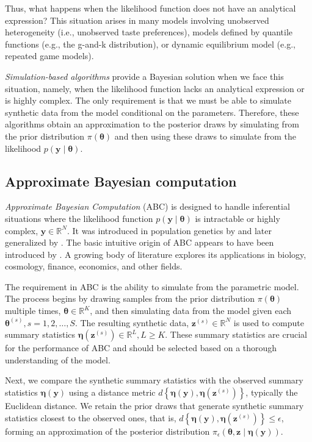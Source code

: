 Thus, what happens when the likelihood function does not have an analytical expression? This situation arises in many models involving unobserved heterogeneity (i.e., unobserved taste preferences), models defined by quantile functions (e.g., the g-and-k distribution), or dynamic equilibrium model (e.g., repeated game models).

\textit{Simulation-based algorithms} provide a Bayesian solution when we face this situation, namely, when the likelihood function lacks an analytical expression or is highly complex. The only requirement is that we must be able to simulate synthetic data from the model conditional on the parameters. Therefore, these algorithms obtain an approximation to the posterior draws by simulating from the prior distribution $\pi(\boldsymbol{\theta})$ and then using these draws to simulate from the likelihood $p(\mathbf{y} \mid \boldsymbol{\theta})$.

\subsection{Approximate Bayesian computation}\label{sec15_12}

\textit{Approximate Bayesian Computation} (ABC) is designed to handle inferential situations where the likelihood function \( p(\boldsymbol{y} \mid \boldsymbol{\theta}) \) is intractable or highly complex, $\boldsymbol{y}\in \mathbb{R}^N$. It was introduced in population genetics by \cite{tavare1997inferring, pritchard1999population} and later generalized by \cite{beaumont2002approximate}. The basic intuitive origin of ABC appears to have been introduced by \cite{rubin1984bayesianly}. A growing body of literature explores its applications in biology, cosmology, finance, economics, and other fields.

The requirement in ABC is the ability to simulate from the parametric model. The process begins by drawing samples from the prior distribution \( \pi({\boldsymbol{\theta}}) \) multiple times, $\boldsymbol{\theta}\in\mathbb{R}^K$, and then simulating data from the model given each \( {\boldsymbol{\theta}^{(s)}}, s=1,2,\dots,S \). The resulting synthetic data, \( \boldsymbol{z}^{(s)} \in \mathbb{R}^N \) is used to compute summary statistics \( \boldsymbol{\eta}(\boldsymbol{z}^{(s)}) \in \mathbb{R}^L, L\geq K \). These summary statistics are crucial for the performance of ABC and should be selected based on a thorough understanding of the model.  

Next, we compare the synthetic summary statistics with the observed summary statistics \( \boldsymbol{\eta}(\boldsymbol{y}) \) using a distance metric \( d\left\{ \boldsymbol\eta ({\boldsymbol y}),{\boldsymbol \eta }({\boldsymbol z}^{(s)})\right\} \), typically the Euclidean distance. We retain the prior draws that generate synthetic summary statistics closest to the observed ones, that is, \( d\left\{ \boldsymbol\eta ({\boldsymbol y}),{\boldsymbol \eta }({\boldsymbol z}^{(s)})\right\}\leq \epsilon \), forming an approximation of the posterior distribution \( \pi_{\epsilon}(\boldsymbol{\theta},\boldsymbol{z} \mid \boldsymbol{\eta}(\boldsymbol{y})) \).

